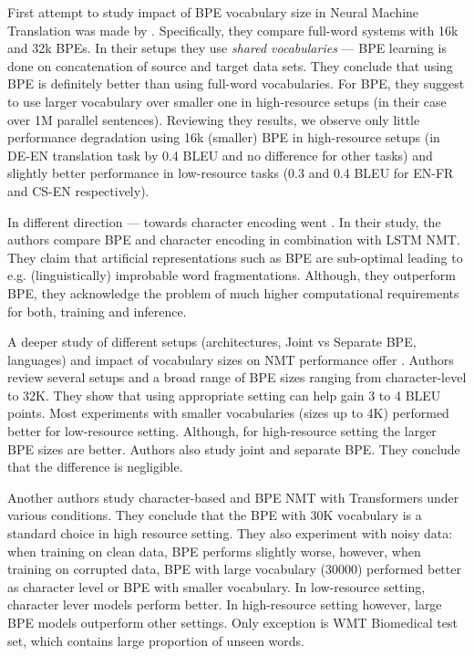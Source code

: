 First attempt to study impact of BPE vocabulary size in Neural Machine Translation was made by . Specifically, they compare full-word systems with 16k and 32k BPEs. In their setups they use \textit{shared vocabularies} --- BPE learning is done on concatenation of source and target data sets. They conclude that using BPE is definitely better than using full-word vocabularies. For BPE, they suggest to use larger vocabulary over smaller one in high-resource setups (in their case over 1M parallel sentences). Reviewing they results, we observe only little performance degradation using 16k (smaller) BPE in high-resource setups (in DE-EN translation task by 0.4 BLEU and no difference for other tasks) and slightly better performance in low-resource tasks (0.3 and 0.4 BLEU for EN-FR and CS-EN respectively).

In different direction --- towards character encoding went . In their study, the authors compare BPE and character encoding in combination with LSTM NMT. They claim that artificial representations such as BPE are sub-optimal leading to e.g. (linguistically) improbable word fragmentations. Although, they outperform BPE, they acknowledge the problem of much higher computational requirements for both, training and inference.

A deeper study of different setups (architectures, Joint vs Separate BPE, languages) and impact of vocabulary sizes on NMT performance offer . Authors review several setups and a broad range of BPE sizes ranging from character-level to 32K. They show that using appropriate setting can help gain 3 to 4 BLEU points. Most experiments with smaller vocabularies (sizes up to 4K) performed better for low-resource setting. Although, for high-resource setting the larger BPE sizes are better. Authors also study joint and separate BPE. They conclude that the difference is negligible.


Another authors  study character-based and BPE NMT with Transformers under various conditions. They conclude that the BPE with 30K vocabulary is a standard choice in high resource setting. They also experiment with noisy data: when training on clean data, BPE performs slightly worse, however, when training on corrupted data, BPE with large vocabulary (30000) performed better as character level or BPE with smaller vocabulary. In low-resource setting, character lever models perform better. In high-resource setting however, large BPE models outperform other settings. Only exception is WMT Biomedical test set, which contains large proportion of unseen words.

